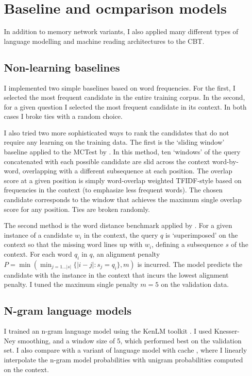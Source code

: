 \section{Baseline and ocmparison models}


In addition to memory network variants, I also applied many different types of
 language modelling and machine reading architectures to the CBT.

\subsection{Non-learning baselines}
I implemented two simple baselines based on word frequencies. For the first, I selected the most frequent candidate in the entire training corpus. In the second, for a given question I selected the most frequent candidate in its context. In both cases I broke ties with a random choice. 

I also tried two more sophisticated ways to rank the candidates that do not require any learning on the training data. The first is the `sliding window' baseline applied to the MCTest by \cite{richardson2013mctest}. In this method, ten `windows' of the query concatenated with each possible candidate are slid across the context word-by-word, overlapping with a different subsequence at each position. The overlap score at a given position is simply word-overlap weighted TFIDF-style based on frequencies in the context (to emphasize less frequent words). The chosen candidate corresponds to the window that achieves the maximum single overlap score for any position. Ties are broken randomly. 

The second method is the word distance benchmark applied by \cite{nips15_hermann}. For a given instance of a candidate \(w_i\) in the context, the query \(q\) is `superimposed' on the context so that the missing word lines up with \(w_i\), defining a subsequence \(s\) of the context. For each word \(q_i\) in \(q\), an alignment penalty $P = \min( \min_{j = 1 \dots |s|} \{|i - j| : s_j = q_i\}, m)$ is incurred. The model predicts the candidate with the instance in the context that incurs the lowest alignment penalty. I tuned the maximum single penalty \(m=5\)  on the validation data.  

\subsection{N-gram language models}
I trained an n-gram language model using the KenLM toolkit \citep{Heafield-estimate}. I used Knesser-Ney smoothing, and a window size of 5, which performed best on the validation set.
%
I also compare with a variant of language model with cache \citep{kuhn1990cache}, where I linearly interpolate the n-gram model probabilities with unigram probabilities computed on the context.

